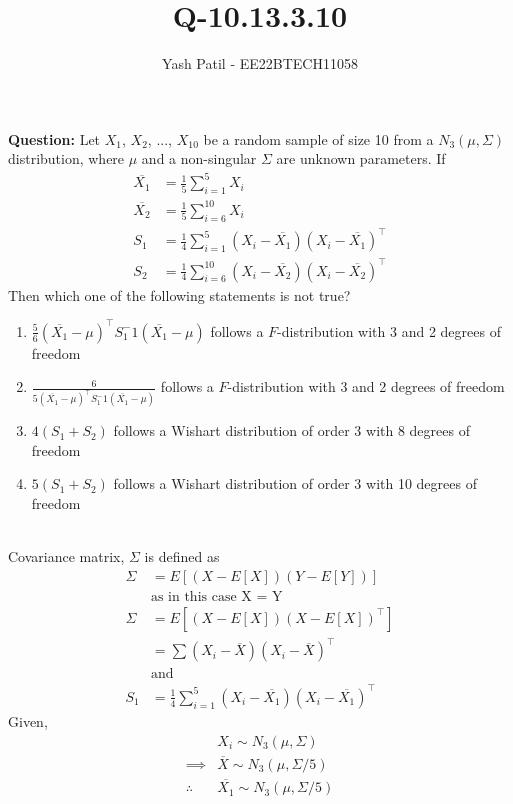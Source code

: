 \documentclass[journal,12pt,twocolumn]{IEEEtran}
\theoremstyle{remark}
\begin{document}



\vspace{3cm}

\title{
Q-10.13.3.10
}
\author{Yash Patil - EE22BTECH11058}

\maketitle
\textbf{Question:} Let $X_1$, $X_2$, ..., $X_{10}$ be a random sample of size 10 from a $N_3(\mu,\Sigma)$ distribution, where $\mu$ and a non-singular $\Sigma$ are unknown parameters. If
\begin{align}
	\overline{X_1} &= \frac{1}{5}\sum_{i=1}^5X_i\\
	\overline{X_2} &= \frac{1}{5}\sum_{i=6}^{10}X_i\\
	S_1 &= \frac{1}{4}\sum_{i=1}^5(X_i-\overline{X_1})(X_i-\overline{X_1})^\top\\
	S_2 &= \frac{1}{4}\sum_{i=6}^{10}(X_i-\overline{X_2})(X_i-\overline{X_2})^\top
\end{align}
Then which one of the following statements is not true?
\begin{enumerate}
	\item $\frac{5}{6}(\overline{X_1}-\mu)^{\top}S_1^-1(\overline{X_1}-\mu)$ follows a $F$-distribution with 3 and 2 degrees of freedom
	\item $\frac{6}{5(\overline{X_1}-\mu)^{\top}S_1^-1(\overline{X_1}-\mu)}$ follows a $F$-distribution with 3 and 2 degrees of freedom
	\item $4(S_1 + S_2)$ follows a Wishart distribution of order 3 with 8 degrees of freedom
	\item $5(S_1 + S_2)$ follows a Wishart distribution of order 3 with 10 degrees of freedom
\end{enumerate}
\solution\\
Covariance matrix, $\Sigma$ is defined as
\begin{align}
	\Sigma &= E[(X-E[X])(Y-E[Y])]\\
	&\text{as in this case X = Y}\\
	\Sigma &= E[(X-E[X])(X-E[X])^\top]\\
	&= \sum(X_i-\overline{X})(X_i-\overline{X})^\top\\
	&\text{and}\\
	S_1 &= \frac{1}{4}\sum_{i=1}^5(X_i-\overline{X_1})(X_i-\overline{X_1})^\top
\end{align}
Given,
\begin{align}
	&X_i \sim N_3(\mu,\Sigma)\\
	\implies &\overline{X} \sim N_3(\mu, \Sigma/5)\\
	\therefore &\overline{X_1} \sim N_3(\mu,\Sigma/5)
\end{align}
\end{document}
